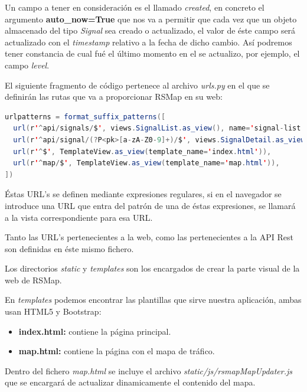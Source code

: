 Un campo a tener en consideración es el llamado \textit{created}, en concreto el argumento \textbf{auto\_now=True} que nos va a permitir que cada vez que un objeto almacenado del tipo \textit{Signal} sea creado o actualizado, el valor de éste campo será actualizado con el \textit{timestamp} relativo a la fecha de dicho cambio. Así podremos tener constancia de cual fué el último momento en el se actualizo, por ejemplo, el campo \textit{level}.


\newpage
El siguiente fragmento de código pertenece al archivo \textit{urls.py} en el que se definirán las rutas que va a proporcionar RSMap en su web:

\begin{lstlisting}[language=java,caption={Definición de URL's},label={lst:pi1}]
urlpatterns = format_suffix_patterns([
  url(r'^api/signals/$', views.SignalList.as_view(), name='signal-list'),
  url(r'^api/signal/(?P<pk>[a-zA-Z0-9]+)/$', views.SignalDetail.as_view(), name='signal-detail'),
  url(r'^$', TemplateView.as_view(template_name='index.html')),
  url(r'^map/$', TemplateView.as_view(template_name='map.html')),
])
\end{lstlisting}

Éstas URL's se definen mediante expresiones regulares, si en el navegador se introduce una URL que entra del patrón de una de éstas expresiones, se llamará a la vista correspondiente para esa URL.

Tanto las URL's pertenecientes a la web, como las pertenecientes a la API Rest son definidas en éste mismo fichero.

\bigskip

Los directorios \textit{static} y \textit{templates} son los encargados de crear la parte visual de la web de RSMap.

En \textit{templates} podemos encontrar las plantillas que sirve nuestra aplicación, ambas usan HTML5 y Bootstrap:

\begin{itemize}
	\item \textbf{index.html:} contiene la página principal.
	\item \textbf{map.html:} contiene la página con el mapa de tráfico.
\end{itemize}

\bigskip

Dentro del fichero \textit{map.html} se incluye el archivo \textit{static\//js\//rsmapMapUpdater.js} que se encargará de actualizar dinamicamente el contenido del mapa.

